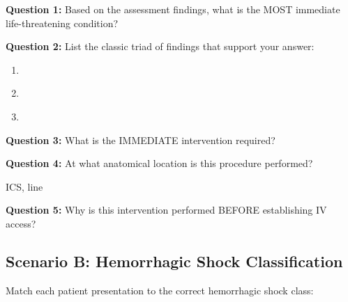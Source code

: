 \documentclass[11pt]{article}
\begin{document}
\textbf{Question 1:} Based on the assessment findings, what is the MOST immediate life-threatening condition?

\underline{\hspace{12cm}}

\vspace{0.3cm}

\textbf{Question 2:} List the classic triad of findings that support your answer:

\begin{enumerate}[label=\alph*.]
    \item \underline{\hspace{8cm}}
    \item \underline{\hspace{8cm}}
    \item \underline{\hspace{8cm}}
\end{enumerate}

\vspace{0.3cm}

\textbf{Question 3:} What is the IMMEDIATE intervention required?

\underline{\hspace{12cm}}

\vspace{0.3cm}

\textbf{Question 4:} At what anatomical location is this procedure performed?

\underline{\hspace{6cm}} ICS, \underline{\hspace{6cm}} line

\vspace{0.3cm}

\textbf{Question 5:} Why is this intervention performed BEFORE establishing IV access?

\underline{\hspace{12cm}}

\underline{\hspace{12cm}}

\vspace{1cm}

\subsection*{Scenario B: Hemorrhagic Shock Classification}

\begin{tcolorbox}[colback=yellow!5!white,colframe=yellow!75!black,title=Patient Data]
Match each patient presentation to the correct hemorrhagic shock class:
\end{tcolorbox}
\end{document}
